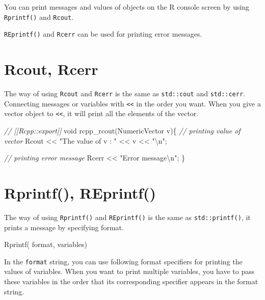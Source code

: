 \documentclass[
]{book}
\newenvironment{Shaded}{\begin{snugshade}}{\end{snugshade}}
\newcommand{\CommentTok}[1]{\textcolor[rgb]{0.56,0.35,0.01}{\textit{#1}}}
\newcommand{\DataTypeTok}[1]{\textcolor[rgb]{0.13,0.29,0.53}{#1}}
\newcommand{\NormalTok}[1]{#1}
\newcommand{\SpecialCharTok}[1]{\textcolor[rgb]{0.00,0.00,0.00}{#1}}
\newcommand{\StringTok}[1]{\textcolor[rgb]{0.31,0.60,0.02}{#1}}
\begin{document}
You can print messages and values of objects on the R console screen by using \texttt{Rprintf()} and \texttt{Rcout}.

\texttt{REprintf()} and \texttt{Rcerr} can be used for printing error messages.

\hypertarget{rcout-rcerr}{%
\section{Rcout, Rcerr}\label{rcout-rcerr}}

The way of using \texttt{Rcout} and \texttt{Rcerr} is the same as \texttt{std::cout} and \texttt{std::cerr}. Connecting messages or variables with \texttt{\textless{}\textless{}} in the order you want. When you give a vector object to \texttt{\textless{}\textless{}}, it will print all the elements of the vector.

\begin{Shaded}
\begin{Highlighting}[]
\CommentTok{// [[Rcpp::export]]}
\DataTypeTok{void}\NormalTok{ rcpp_rcout(NumericVector v)\{}
  \CommentTok{// printing value of vector}
\NormalTok{  Rcout << }\StringTok{"The value of v : "}\NormalTok{ << v << }\StringTok{"}\SpecialCharTok{\textbackslash{}n}\StringTok{"}\NormalTok{;}

  \CommentTok{// printing error message}
\NormalTok{  Rcerr << }\StringTok{"Error message}\SpecialCharTok{\textbackslash{}n}\StringTok{"}\NormalTok{;}
\NormalTok{\}}
\end{Highlighting}
\end{Shaded}

\hypertarget{rprintf-reprintf}{%
\section{Rprintf(), REprintf()}\label{rprintf-reprintf}}

The way of using \texttt{Rprintf()} and \texttt{REprintf()} is the same as \texttt{std::printf()}, it prints a message by specifying format.

\begin{Shaded}
\begin{Highlighting}[]
\NormalTok{Rprintf( format, variables)}
\end{Highlighting}
\end{Shaded}

In the \texttt{format} string, you can use following format specifiers for printing the values of variables. When you want to print multiple variables, you have to pass these variables in the order that its corresponding specifier appears in the format string.
\end{document}
